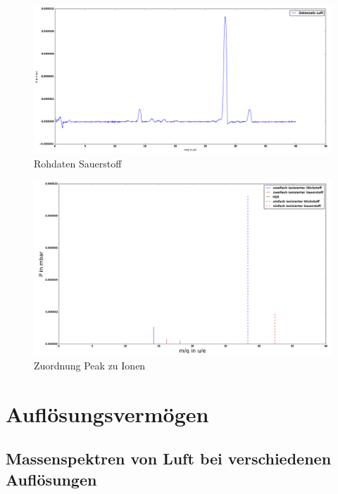 \documentclass[10pt,a4paper]{article}
\begin{document}
\begin{figure}[h]
	\includegraphics[scale = 0.5]{sauerroh.png}
	\centering
	\caption{Rohdaten Sauerstoff}
	\label{f1}
\end{figure}

\begin{figure}[h]
	\includegraphics[scale = 0.5]{sauerstoff.png}
	\centering
	\caption{Zuordnung Peak zu Ionen}
	\label{f2}
\end{figure}
	

\section{Auflösungsvermögen}

\subsection{Massenspektren von Luft bei verschiedenen Auflösungen}
\end{document}
